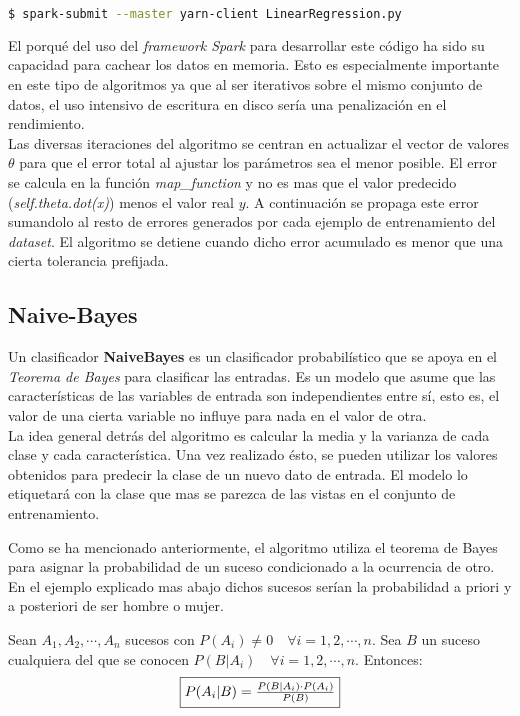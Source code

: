 \begin{lstlisting}[language=bash, numbers=none]
$ spark-submit --master yarn-client LinearRegression.py
\end{lstlisting}

El porqué del uso del \textit{framework Spark} para desarrollar este código ha sido su capacidad para cachear 
los datos en memoria. Esto es especialmente importante en este tipo de algoritmos ya que al ser iterativos sobre 
el mismo conjunto de datos, el uso intensivo de escritura en disco sería una penalización en el rendimiento.\\
Las diversas iteraciones del algoritmo se centran en actualizar el vector de valores $\theta$ para que el error
total al ajustar los parámetros sea el menor posible. El error se calcula en la función \textit{map\_function} 
y no es mas que el valor predecido (\textit{self.theta.dot(x)}) menos el valor real $y$. A continuación se propaga
este error sumandolo al resto de errores generados por cada ejemplo de entrenamiento del \textit{dataset}. El algoritmo
se detiene cuando dicho error acumulado es menor que una cierta tolerancia prefijada.

\clearpage

\subsection{Naive-Bayes}
Un clasificador \textbf{NaiveBayes} es un clasificador probabilístico que se apoya en el 
\textit{Teorema de Bayes} para clasificar las entradas.
Es un modelo que asume que las características de las variables de entrada son independientes 
entre sí, esto es, el valor de una cierta variable no influye para nada en el valor de otra.\\
La idea general detrás del algoritmo es calcular la media y la varianza de cada clase y cada característica.
Una vez realizado ésto, se pueden utilizar los valores obtenidos para predecir la clase de un nuevo 
dato de entrada. El modelo lo etiquetará con la clase que mas se parezca de las vistas en el 
conjunto de entrenamiento.
\newline

Como se ha mencionado anteriormente, el algoritmo utiliza el teorema de Bayes para asignar la probabilidad de
un suceso condicionado a la ocurrencia de otro. En el ejemplo explicado mas abajo dichos sucesos serían la
probabilidad a priori y a posteriori de ser hombre o mujer.

\begin{theorem}
  Sean ${A_1, A_2, \cdots, A_n}$ sucesos con $P(A_i) \neq 0 \quad \forall i=1, 2, \cdots, n$. 
  Sea $B$ un suceso cualquiera del que se conocen $P(B|A_i) \quad \forall i=1, 2, \cdots, n$.
  Entonces:
  {\fboxsep 8pt\fboxrule 1pt
  \begin{equation*}
  \fbox{$ P(A_i|B) = \frac{P(B|A_i) \cdot P(A_i)}{P(B)} $}
  \end{equation*}
  }
\end{theorem}

